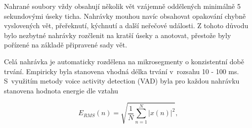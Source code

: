 \noindent
Nahrané soubory vždy obsahují několik vět vzájemně oddělených minimálně 5 sekundovými úseky ticha.
Nahrávky mouhou navíc obsahovat opakování chybně vyslovených vět, přeřeknutí, kýchnutí a další neřečové události.
Z tohoto důvodu bylo nezbytné nahrávky rozčlenit na kratší úseky a anotovat, přestože byly pořízené na základě připravené sady vět.

Celá nahrávka je automaticky rozdělena na mikrosegmenty o konzistentní době trvání. Empiricky byla stanovena vhodná délka trvání v~rozsahu 10 - 100 ms. S~využitím metody voice activity detection (VAD) byla pro každou nahrávku stanovena hodnota energie dle vztahu


\begin{equation}
  \label{eq:construction:energy}
  E_{RMS}(n) = \sqrt{\frac{1}{N} \sum_{n=1}^{N} \left| x(n) \right|^2},
\end{equation}

